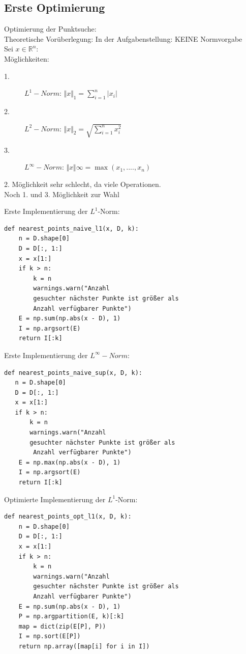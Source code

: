 \documentclass{beamer}
\begin{document}
\subsection{Erste Optimierung}

\begin{frame}[fragile]
Optimierung der Punktsuche:\\
Theoretische Vorüberlegung:
In der Aufgabenstellung: KEINE Normvorgabe\\
Sei $ x \in \mathbb{R} ^n$:\\
Möglichkeiten:
\begin{description}
\item[1.] $L^1-Norm$: $\Vert x\Vert _{1}= \sum_{i=1}^n |x_i| $
\item[2.] $L^2-Norm$:  $\Vert x\Vert _{2}=\sqrt{ \sum_{i=1}^n x_i ^2} $
\item[3.] $L^{\infty}-Norm$:  $\Vert x\Vert {\infty}= \max(x_1,....,x_n)$
\end{description}
2. Möglichkeit sehr schlecht, da viele Operationen.\\
Noch 1. und 3. Möglichkeit zur Wahl
\end{frame}


\begin{frame}[fragile]
Erste Implementierung der $L^1$-Norm:
\begin{verbatim}
def nearest_points_naive_l1(x, D, k):
    n = D.shape[0]
    D = D[:, 1:]
    x = x[1:]
    if k > n:
        k = n  
        warnings.warn("Anzahl
        gesuchter nächster Punkte ist größer als
        Anzahl verfügbarer Punkte")
    E = np.sum(np.abs(x - D), 1)
    I = np.argsort(E)
    return I[:k]
\end{verbatim}
\end{frame}



\begin{frame}[fragile]
Erste Implementierung der $L^{\infty}-Norm$:
\begin{verbatim}
def nearest_points_naive_sup(x, D, k):
   n = D.shape[0]
   D = D[:, 1:]
   x = x[1:]
   if k > n:
       k = n 
       warnings.warn("Anzahl
       gesuchter nächster Punkte ist größer als 
        Anzahl verfügbarer Punkte")
    E = np.max(np.abs(x - D), 1)
    I = np.argsort(E)
    return I[:k]
\end{verbatim} 
\end{frame}

\begin{frame}[fragile]
Optimierte Implementierung der $L^1$-Norm:
\begin{verbatim}
def nearest_points_opt_l1(x, D, k):
    n = D.shape[0]
    D = D[:, 1:]
    x = x[1:]
    if k > n:
        k = n  
        warnings.warn("Anzahl
        gesuchter nächster Punkte ist größer als
        Anzahl verfügbarer Punkte")
    E = np.sum(np.abs(x - D), 1)
    P = np.argpartition(E, k)[:k]
    map = dict(zip(E[P], P))
    I = np.sort(E[P])
    return np.array([map[i] for i in I])
\end{verbatim}
\end{frame}
\end{document}
